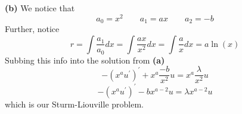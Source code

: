 \documentclass[10pt]{article}
\begin{document}
\textbf{(b)}
We notice that
$$a_{0} = x^{2} \hspace{2em} a_{1} = ax \hspace{2em} a_{2} = -b$$
Further, notice
$$r=\int \frac{a_{1}}{a_{0}}dx = \int \frac{ax}{x^{2}}dx = \int \frac{a}{x}dx = a\ln (x)$$
Subbing this info into the solution from \textbf{(a)}
$$-(x^{a}u^{\prime})^{\prime}+x^{a}\frac{-b}{x^{2}}u = x^{a}\frac{\lambda}{x^{2}}u$$
$$-(x^{a}u^{\prime})^{\prime}-bx^{a-2}u = \lambda x^{a-2}u$$
which is our Sturm-Liouville problem.
\end{document}
